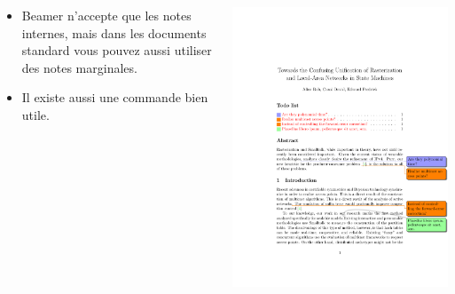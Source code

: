\documentclass{beamer}
\begin{document}
\begin{frame}[fragile]{\insertsection}
\begin{columns}
  \begin{column}{0.4\textwidth}
    \begin{itemize}
    \item Beamer n'accepte que les notes internes, mais dans les documents standard vous pouvez aussi utiliser des notes marginales.
    \item Il existe aussi une commande  bien utile.
    \end{itemize}
  \end{column}
  \begin{column}{0.6\textwidth}
    \includegraphics[width=\textwidth,page=1]{todonotes-example}
  \end{column}
\end{columns}
\end{frame}
\end{document}
